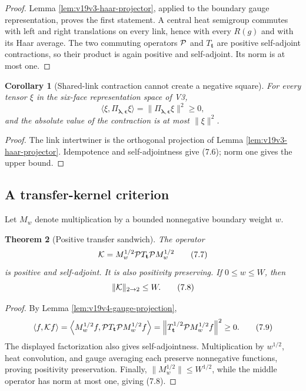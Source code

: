\documentclass[11pt]{article}
\newtheorem{theorem}{Theorem}[section]
\newtheorem{corollary}[theorem]{Corollary}
\theoremstyle{remark}
\begin{document}
\begin{proof}
Lemma \ref{lem:v19v3-haar-projector}, applied to the boundary gauge
representation, proves the first statement.  A central heat semigroup
commutes with left and right translations on every link, hence with every
\(R(g)\) and with its Haar average.  The two commuting operators
\({\cal P}\) and \(T_{\mathbf t}\) are positive self-adjoint contractions,
so their product is again positive and self-adjoint.  Its norm is at most
one.
\end{proof}

\begin{corollary}[Shared-link contraction cannot create a negative square]
\label{cor:v19v4-link-square}
For every tensor \(\xi\) in the six-face representation space of V3,
\[
 \langle\xi,\Pi_{\boldsymbol\lambda,\boldsymbol\epsilon}\xi\rangle
 =\|\Pi_{\boldsymbol\lambda,\boldsymbol\epsilon}\xi\|^2
 \ge0,                                                     \tag{7.6}
\]
and the absolute value of the contraction is at most \(\|\xi\|^2\).
\end{corollary}

\begin{proof}
The link intertwiner is the orthogonal projection of Lemma
\ref{lem:v19v3-haar-projector}.  Idempotence and self-adjointness give
(7.6); norm one gives the upper bound.
\end{proof}

\subsection{A transfer-kernel criterion}

Let \(M_w\) denote multiplication by a bounded nonnegative boundary weight
\(w\).

\begin{theorem}[Positive transfer sandwich]
\label{thm:v19v4-sandwich}
The operator
\[
 {\cal K}=M_w^{1/2}{\cal P}T_{\mathbf t}{\cal P}M_w^{1/2} \tag{7.7}
\]
is positive and self-adjoint.  It is also positivity preserving.  If
\(0\le w\le W\), then
\[
 \|{\cal K}\|_{2\to2}\le W.                               \tag{7.8}
\]
\end{theorem}

\begin{proof}
By Lemma \ref{lem:v19v4-gauge-projection},
\[
 \langle f,{\cal K}f\rangle
 =\left\langle M_w^{1/2}f,
 {\cal P}T_{\mathbf t}{\cal P}M_w^{1/2}f\right\rangle
 =\left\|T_{\mathbf t}^{1/2}{\cal P}M_w^{1/2}f\right\|^2
 \ge0.                                                     \tag{7.9}
\]
The displayed factorization also gives self-adjointness.  Multiplication by
\(w^{1/2}\), heat convolution, and gauge averaging each preserve
nonnegative functions, proving positivity preservation.  Finally,
\(\|M_w^{1/2}\|\le W^{1/2}\), while the middle operator has norm at most
one, giving (7.8).
\end{proof}
\end{document}
